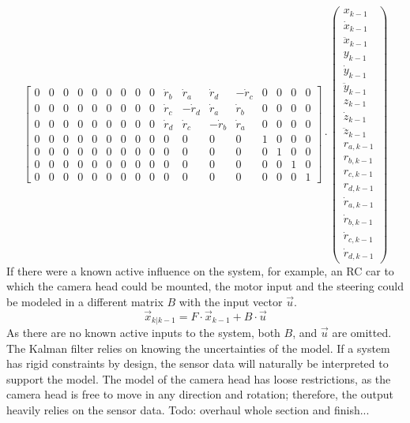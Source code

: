 \begin{equation*}
\begin{bmatrix}
        0 & 0 & 0 & 0 & 0 & 0 & 0 & 0 & 0 & \dot{r}_{b} &  \dot{r}_{a} &  \dot{r}_{d} & -\dot{r}_{c} & 0 & 0 & 0 & 0 \\
        0 & 0 & 0 & 0 & 0 & 0 & 0 & 0 & 0 & \dot{r}_{c} & -\dot{r}_{d} &  \dot{r}_{a} &  \dot{r}_{b} & 0 & 0 & 0 & 0 \\
        0 & 0 & 0 & 0 & 0 & 0 & 0 & 0 & 0 & \dot{r}_{d} &  \dot{r}_{c} & -\dot{r}_{b} &  \dot{r}_{a} & 0 & 0 & 0 & 0 \\
        0 & 0 & 0 & 0 & 0 & 0 & 0 & 0 & 0 & 0 & 0 & 0 & 0 & 1 & 0 & 0 & 0 \\
        0 & 0 & 0 & 0 & 0 & 0 & 0 & 0 & 0 & 0 & 0 & 0 & 0 & 0 & 1 & 0 & 0 \\
        0 & 0 & 0 & 0 & 0 & 0 & 0 & 0 & 0 & 0 & 0 & 0 & 0 & 0 & 0 & 1 & 0 \\
        0 & 0 & 0 & 0 & 0 & 0 & 0 & 0 & 0 & 0 & 0 & 0 & 0 & 0 & 0 & 0 & 1
    \end{bmatrix} 
    \cdot 
    \begin{pmatrix}
        x_{k-1}\\
        \dot{x}_{k-1}\\
        \ddot{x}_{k-1}\\
        y_{k-1}\\
        \dot{y}_{k-1}\\
        \ddot{y}_{k-1}\\
        z_{k-1}\\
        \dot{z}_{k-1}\\
        \ddot{z}_{k-1}\\
        r_{a,k-1}\\
        r_{b,k-1}\\
        r_{c,k-1}\\
        r_{d,k-1}\\
        \dot{r}_{a,k-1}\\
        \dot{r}_{b,k-1}\\
        \dot{r}_{c,k-1}\\
        \dot{r}_{d,k-1}
    \end{pmatrix}
\end{equation*}
If there were a known active influence on the system, for example, an RC car to which the camera head could be mounted, the motor input and the steering could be modeled in a different matrix $B$ with the input vector $\vec{u}$.
\begin{equation*}
    \vec{x}_{k|k-1} = 
    F
    \cdot
    \vec{x}_{k-1}
    +
    B
    \cdot
    \vec{u}
\end{equation*}
As there are no known active inputs to the system, both $B$, and $\vec{u}$ are omitted.\\
The Kalman filter relies on knowing the uncertainties of the model. If a system has rigid constraints by design, the sensor data will naturally be interpreted to support the model. The model of the camera head has loose restrictions, as the camera head is free to move in any direction and rotation; therefore, the output heavily relies on the sensor data. 
Todo: overhaul whole section and finish...
